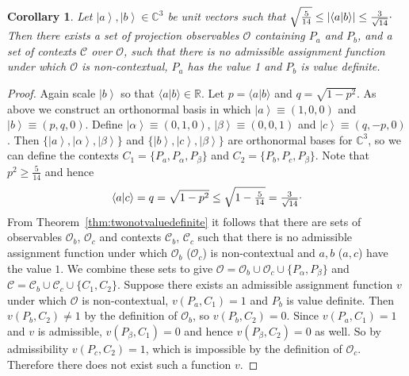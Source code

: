 \documentclass[%
 preprint,
 showpacs,
 showkeys,
 amsmath,
 amssymb,
 aps,
 pra,
 ]{revtex4-1}
\newtheorem{Corollary}[Theorem]{Corollary}
\theoremstyle{definition}
\newcommand{\ket}[1]{\left| #1 \right>}
\newcommand{\iprod}[2]{\langle #1 | #2 \rangle}
\begin{document}
\begin{Corollary}
\label{cor:twonotvaluedefinite}
	Let $\ket{a}, \ket{b}\in \mathbb{C}^3$ be unit vectors such that $\sqrt{\frac{5}{14}} \le |\iprod{a}{b}| \le \frac{3}{\sqrt{14}}\raisebox{.8mm}{.}$
	Then there exists a set of projection observables $\mathcal{O}$ containing $P_a$ and $P_b$, and a set of contexts $\mathcal{C}$ over $\mathcal{O}$, such that there is no admissible assignment function under which $\mathcal{O}$ is non-contextual, $P_a$ has the value 1 and $P_b$ is value definite.
\end{Corollary}
\begin{proof}
	Again scale $\ket{b}$ so that $\iprod{a}{b} \in \mathbb{R}$.
	Let $p = \iprod{a}{b}$ and $q = \sqrt{1 - p^2}$.
	As above we construct an orthonormal basis in which $\ket{a} \equiv (1,0,0)$ and $\ket{b} \equiv (p,q,0)$.
	Define $\ket{\alpha} \equiv (0,1,0)$, $\ket{\beta} \equiv (0,0,1)$ and $\ket{c} \equiv (q,-p,0)$.
	Then $\{ \ket{a}, \ket{\alpha}, \ket{\beta} \}$ and $\{ \ket{b}, \ket{c}, \ket{\beta} \}$ are orthonormal bases for $\mathbb{C}^3$, so we can define the contexts $C_1 = \{ P_a, P_\alpha, P_\beta \}$ and $C_2 = \{ P_b, P_c, P_\beta \}$.
	Note that $p^2 \ge \frac{5}{14}$ and hence $$\iprod{a}{c} = q = \sqrt{1 - p^2} \le \sqrt{1 - \tfrac{5}{14}} = \tfrac{3}{\sqrt{14}}\raisebox{.8mm}{.}$$
	From Theorem~\ref{thm:twonotvaluedefinite} it follows that there are sets of observables $\mathcal{O}_b$, $\mathcal{O}_c$ and contexts $\mathcal{C}_b$, $\mathcal{C}_c$ such that there is no admissible assignment function under which $\mathcal{O}_b$ ($\mathcal{O}_c$) is non-contextual and $a, b$ ($a, c$) have the value $1$.
	We combine these sets to give $\mathcal{O} = \mathcal{O}_b \cup \mathcal{O}_c \cup \{ P_\alpha, P_\beta \}$ and $\mathcal{C} = \mathcal{C}_b \cup \mathcal{C}_c \cup \{ C_1, C_2 \}$.
	Suppose there exists an admissible assignment function $v$ under which $\mathcal{O}$ is non-contextual, $v(P_a, C_1) = 1$ and $P_b$ is value definite.
	Then $v(P_b, C_2) \neq 1$ by the definition of $\mathcal{O}_b$, so $v(P_b, C_2) = 0$.
	Since $v(P_a, C_1) = 1$ and $v$ is admissible, $v(P_\beta, C_1) = 0$ and hence $v(P_\beta, C_2) = 0$ as well.
	So by admissibility $v(P_c, C_2) = 1$, which is impossible by the definition of $\mathcal{O}_c$.
	Therefore there does not exist such a function $v$.
\end{proof}
\end{document}
